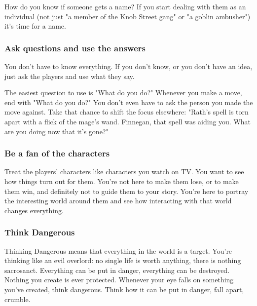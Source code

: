        

How do you know if someone gets a name? If you start dealing with them as an individual (not just "a member of the Knob Street gang" or "a goblin ambusher") it's time for a name.

       
\subsubsection{Ask questions and use the answers}    
       

You don't have to know everything. If you don't know, or you don't have an idea, just ask the players and use what they say.

       

The easiest question to use is "What do you do?" Whenever you make a move, end with "What do you do?" You don't even have to ask the person you made the move against. Take that chance to shift the focus elsewhere: "Rath's spell is torn apart with a flick of the mage's wand. Finnegan, that spell was aiding you. What are you doing now that it's gone?"

       
\subsubsection{Be a fan of the characters}    
       

Treat the players' characters like characters you watch on TV. You want to see how things turn out for them. You're not here to make them lose, or to make them win, and definitely not to guide them to your story. You're here to portray the interesting world around them and see how interacting with that world changes everything.

       
\subsubsection{Think Dangerous}   
       

Thinking Dangerous means that everything in the world is a target. You're thinking like an evil overlord: no single life is worth anything, there is nothing sacrosanct. Everything can be put in danger, everything can be destroyed. Nothing you create is ever protected. Whenever your eye falls on something you've created, think dangerous. Think how it can be put in danger, fall apart, crumble.

